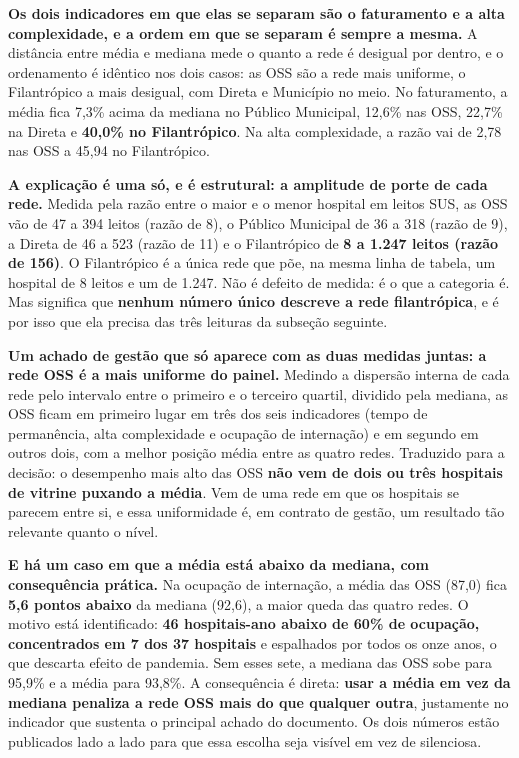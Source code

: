 \textbf{Os dois indicadores em que elas se separam são o faturamento e a
alta complexidade, e a ordem em que se separam é sempre a mesma.} A
distância entre média e mediana mede o quanto a rede é desigual por dentro,
e o ordenamento é idêntico nos dois casos: as OSS são a rede mais uniforme,
o Filantrópico a mais desigual, com Direta e Município no meio. No
faturamento, a média fica 7,3\% acima da mediana no Público Municipal,
12,6\% nas OSS, 22,7\% na Direta e \textbf{40,0\% no Filantrópico}. Na alta
complexidade, a razão vai de 2,78 nas OSS a 45,94 no Filantrópico.

\textbf{A explicação é uma só, e é estrutural: a amplitude de porte de cada
rede.} Medida pela razão entre o maior e o menor hospital em leitos SUS, as
OSS vão de 47 a 394 leitos (razão de 8), o Público Municipal de 36 a 318
(razão de 9), a Direta de 46 a 523 (razão de 11) e o Filantrópico de
\textbf{8 a 1.247 leitos (razão de 156)}. O Filantrópico é a única rede que
põe, na mesma linha de tabela, um hospital de 8 leitos e um de 1.247. Não é
defeito de medida: é o que a categoria é. Mas significa que \textbf{nenhum
número único descreve a rede filantrópica}, e é por isso que ela precisa das
três leituras da subseção seguinte.

\textbf{Um achado de gestão que só aparece com as duas medidas juntas: a
rede OSS é a mais uniforme do painel.} Medindo a dispersão interna de cada
rede pelo intervalo entre o primeiro e o terceiro quartil, dividido pela
mediana, as OSS ficam em primeiro lugar em três dos seis indicadores (tempo
de permanência, alta complexidade e ocupação de internação) e em segundo em
outros dois, com a melhor posição média entre as quatro redes. Traduzido
para a decisão: o desempenho mais alto das OSS \textbf{não vem de dois ou
três hospitais de vitrine puxando a média}. Vem de uma rede em que os
hospitais se parecem entre si, e essa uniformidade é, em contrato de
gestão, um resultado tão relevante quanto o nível.

\textbf{E há um caso em que a média está abaixo da mediana, com
consequência prática.} Na ocupação de internação, a média das OSS (87,0)
fica \textbf{5,6 pontos abaixo} da mediana (92,6), a maior queda das quatro
redes. O motivo está identificado: \textbf{46 hospitais-ano abaixo de 60\%
de ocupação, concentrados em 7 dos 37 hospitais} e espalhados por todos os
onze anos, o que descarta efeito de pandemia. Sem esses sete, a mediana das
OSS sobe para 95,9\% e a média para 93,8\%. A consequência é direta:
\textbf{usar a média em vez da mediana penaliza a rede OSS mais do que
qualquer outra}, justamente no indicador que sustenta o principal achado do
documento. Os dois números estão publicados lado a lado para que essa
escolha seja visível em vez de silenciosa.


